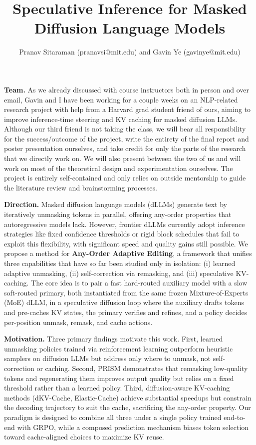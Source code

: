 \documentclass[10pt]{article}
\title{\vspace{-1.5em}\textbf{Speculative Inference for Masked Diffusion Language Models}\vspace{-1em}}
\author{Pranav Sitaraman (pranavsi@mit.edu) and Gavin Ye (gavinye@mit.edu)}
\date{}
\begin{document}
\maketitle
\thispagestyle{empty}
\vspace{-1.5em}
\textbf{Team.} As we already discussed with course instructors both in person and over email, Gavin and I have been working for a couple weeks on an NLP-related research project with help from a Harvard grad student friend of ours, aiming to improve inference-time steering and KV caching for masked diffusion LLMs. Although our third friend is not taking the class, we will bear all responsibility for the success/outcome of the project, write the entirety of the final report and poster presentation ourselves, and take credit for only the parts of the research that we directly work on. We will also present between the two of us and will work on most of the theoretical design and experimentation ourselves. The project is entirely self-contained and only relies on outside mentorship to guide the literature review and brainstorming processes.

\textbf{Direction.} Masked diffusion language models (dLLMs) generate text by iteratively unmasking tokens in parallel, offering any-order properties that autoregressive models lack. However, frontier dLLMs currently adopt inference strategies like fixed confidence thresholds or rigid block schedules that fail to exploit this flexibility, with significant speed and quality gains still possible. We propose a method for \textbf{Any-Order Adaptive Editing}, a framework that unifies three capabilities that have so far been studied only in isolation: (i) learned adaptive unmasking, (ii) self-correction via remasking, and (iii) speculative KV-caching. The core idea is to pair a fast hard-routed auxiliary model with a slow soft-routed primary, both instantiated from the same frozen Mixture-of-Experts (MoE) dLLM, in a speculative diffusion loop where the auxiliary drafts tokens and pre-caches KV states, the primary verifies and refines, and a policy decides per-position unmask, remask, and cache actions.

\textbf{Motivation.} Three primary findings motivate this work. First, learned unmasking policies trained via reinforcement learning outperform heuristic samplers on diffusion LLMs but address only where to unmask, not self-correction or caching. Second, PRISM demonstrates that remasking low-quality tokens and regenerating them improves output quality but relies on a fixed threshold rather than a learned policy. Third, diffusion-aware KV-caching methods (dKV-Cache, Elastic-Cache) achieve substantial speedups but constrain the decoding trajectory to suit the cache, sacrificing the any-order property. Our paradigm is designed to combine all three under a single policy trained end-to-end with GRPO, while a composed prediction mechanism biases token selection toward cache-aligned choices to maximize KV reuse.
\end{document}
